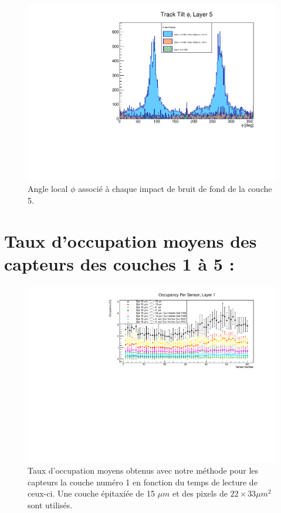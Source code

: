\begin{appendices}
  \begin{figure}[!htb]
    \centering
    \includegraphics[scale=0.58]{./figures/Track_Tilts_Beamstrahlung/beamstrahlung_Phi/Track_Tilts_Phi_Layer5.pdf}
    \caption{Angle local $\phi$ associ\'e \`a chaque impact de bruit de fond de la couche 5.}
    \label{fig:phi_Layer5}
  \end{figure}

  \section{Taux d'occupation moyens des capteurs des couches 1 \`a 5 :}
  \label{annexe:tx_occ_moy}
  
     \begin{figure}[!htb]
    \begin{center}
      \includegraphics[scale=0.80]{./figures/sensors_Readout_Time/resultOccupancyPerSensor/occupancyPerSensor_Layer1_epi15um.pdf}
      \caption{Taux d'occupation moyens obtenus avec notre m\'ethode pour les capteurs la couche num\'ero 1 en fonction du temps de lecture de ceux-ci. Une couche \'epitaxi\'ee de 15 $\mu m$ et des pixels de $22 \times 33 \mu m^2$ sont utilis\'es.}
      \label{fig:OccupancyLayer1_epi15um}
    \end{center}
  \end{figure}


\end{appendices}
